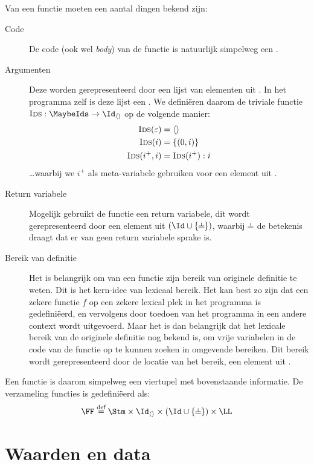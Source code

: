 Van een functie moeten een aantal dingen bekend zijn:
\begin{description}
  \item[Code] De code (ook wel \emph{body}) van de functie is natuurlijk simpelweg een \Stm.
  \item[Argumenten] Deze worden gerepresenteerd door een lijst van elementen uit \Id. In het programma zelf is deze lijst een \MaybeIds. We definiëren daarom de triviale functie $\textsc{Ids} : \MaybeIds \to \Id_{\langle\rangle}$ op de volgende manier:
  \begin{align*}
    \textsc{Ids}(\varepsilon) &= \langle\rangle \\
    \textsc{Ids}(i) &= \{(0, i)\} \\
    \textsc{Ids}(i^+, i) &= \textsc{Ids}(i^+) : i
  \end{align*}
  \dots waarbij we $i^+$ als meta-variabele gebruiken voor een element uit \Ids.
  \item[Return variabele] Mogelijk gebruikt de functie een return variabele, dit wordt gerepresenteerd door een element uit $(\Id \cup \{\nil\})$, waarbij $\nil$ de betekenis draagt dat er van geen return variabele sprake is.
  \item[Bereik van definitie] Het is belangrijk om van een functie zijn bereik van originele definitie te weten. Dit is het kern-idee van lexicaal bereik. Het kan best zo zijn dat een zekere functie $f$ op een zekere lexical plek in het programma is gedefiniëerd, en vervolgens door toedoen van het programma in een andere context wordt uitgevoerd. Maar het is dan belangrijk dat het lexicale bereik van de originele definitie nog bekend is, om vrije variabelen in de code van de functie op te kunnen zoeken in omgevende bereiken. Dit bereik wordt gerepresenteerd door de locatie van het bereik, een element uit \LLs.
\end{description}

Een functie is daarom simpelweg een viertupel met bovenstaande informatie. De verzameling functies is gedefiniëerd als:
\begin{equation*}
  \FF \DEF \Stm \times \Id_{\langle\rangle} \times (\Id \cup \{\nil\}) \times \LL
\end{equation*}

\section{Waarden en data}
\label{sec:waarden}

